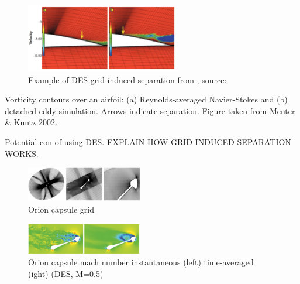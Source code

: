 \documentclass[journal]{new-aiaa}
\begin{document}
\begin{figure}[H]
\begin{center}
\includegraphics[width=0.6\textwidth]{Images/logan/spalart2009detachededdy_GridInducedSeparation.pdf}
\caption{ Example of DES grid induced separation from \cite{spalart2009detachededdy}, source: \cite{menter2004adaptation} }
\label{fig:desgridinducedseparation}
\end{center}
\end{figure}

Vorticity contours over an airfoil: (a) Reynolds-averaged Navier-Stokes and (b) detached-eddy simulation.
Arrows indicate separation. Figure taken from Menter \& Kuntz 2002.

Potential con of using DES. EXPLAIN HOW GRID INDUCED SEPARATION WORKS.







\begin{figure}[H]
\begin{center}
\includegraphics[width=0.45\textwidth]{Images/logan/schwing2015detachededdy_grid.pdf}
\caption{ Orion capsule grid \cite{schwing2015detachededdy} }
\label{fig:oriongrid}
\end{center}
\end{figure}


\begin{figure}[H]
\begin{center}
\includegraphics[width=0.45\textwidth]{Images/logan/schwing2015detachededdy_flow.pdf}
\caption{ Orion capsule mach number instantaneous (left) time-averaged (ight) (DES, M=0.5) \cite{schwing2015detachededdy} }
\label{fig:orionflow}
\end{center}
\end{figure}
\end{document}
